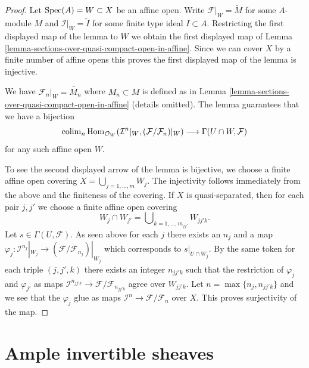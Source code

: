 \begin{proof}
Let $\mathop{\mathrm{Spec}}(A) = W \subset X$ be an affine open. Write
$\mathcal{F}|_W = \widetilde{M}$ for some $A$-module $M$
and $\mathcal{I}|_W = \widetilde{I}$ for some finite type
ideal $I \subset A$. Restricting the first displayed map
of the lemma to $W$ we obtain the first displayed map of
Lemma \ref{lemma-sections-over-quasi-compact-open-in-affine}.
Since we can cover $X$ by a finite number of affine opens this
proves the first displayed map of the lemma is injective.

\medskip\noindent
We have $\mathcal{F}_n|_W = \widetilde{M_n}$ where
$M_n \subset M$ is defined as in
Lemma \ref{lemma-sections-over-quasi-compact-open-in-affine}
(details omitted). The lemma guarantees that we have a bijection
$$
\mathop{\mathrm{colim}}\nolimits_n  \mathop{\mathrm{Hom}}\nolimits_{\mathcal{O}_W}(
\mathcal{I}^n|_W, (\mathcal{F}/\mathcal{F}_n)|_W)
\longrightarrow
\Gamma(U \cap W, \mathcal{F})
$$
for any such affine open $W$.

\medskip\noindent
To see the second displayed arrow of the lemma is bijective,
we choose a finite affine open covering $X = \bigcup_{j = 1, \ldots, m} W_j$.
The injectivity follows immediately from the above and the finiteness of
the covering. If $X$ is quasi-separated, then for each pair
$j, j'$ we choose a finite affine open covering
$$
W_j \cap W_{j'} = \bigcup\nolimits_{k = 1, \ldots, m_{jj'}} W_{jj'k}.
$$
Let $s \in \Gamma(U, \mathcal{F})$. As seen above for each $j$ there exists
an $n_j$ and a map
$\varphi_j : \mathcal{I}^{n_j}|_{W_j} \to
(\mathcal{F}/\mathcal{F}_{n_j})|_{W_j}$
which corresponds to $s|_{U \cap W_j}$.
By the same token for each triple $(j, j', k)$ there exists an integer
$n_{jj'k}$ such that the restriction of $\varphi_j$ and $\varphi_{j'}$
as maps $\mathcal{I}^{n_{jj'k}} \to \mathcal{F}/\mathcal{F}_{n_{jj'k}}$
agree over $W_{jj'k}$. Let $n = \max\{n_j, n_{jj'k}\}$ and we see that
the $\varphi_j$ glue as maps
$\mathcal{I}^n \to \mathcal{F}/\mathcal{F}_n$ over $X$.
This proves surjectivity of the map.
\end{proof}













\section{Ample invertible sheaves}
\label{section-ample}


